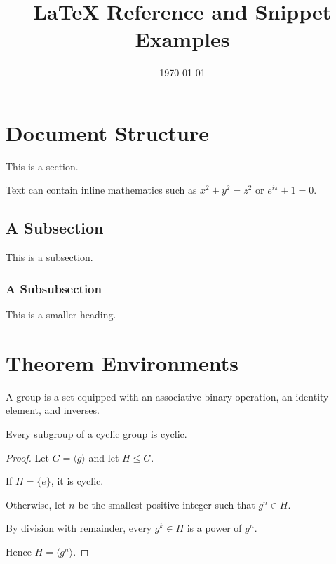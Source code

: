 \documentclass{article}
\title{LaTeX Reference and Snippet Examples}
\author{\defaultauthor}
\date{\today}
\begin{document}
\maketitle
\tableofcontents
\newpage

\section{Document Structure}

This is a section.

Text can contain inline mathematics such as
$x^2+y^2=z^2$ or \(e^{i\pi}+1=0\).

\subsection{A Subsection}

This is a subsection.

\subsubsection{A Subsubsection}

This is a smaller heading.


\section{Theorem Environments}

\begin{definition}
    A group is a set equipped with an associative
    binary operation, an identity element, and inverses.
\end{definition}

\begin{theorem}
    Every subgroup of a cyclic group is cyclic.
\end{theorem}

\begin{proof}
    Let $G=\langle g\rangle$ and let $H\leq G$.

    If $H=\{e\}$, it is cyclic.

    Otherwise, let $n$ be the smallest positive integer
    such that $g^n\in H$.

    By division with remainder, every $g^k\in H$
    is a power of $g^n$.

    Hence $H=\langle g^n\rangle$.
\end{proof}
\end{document}

